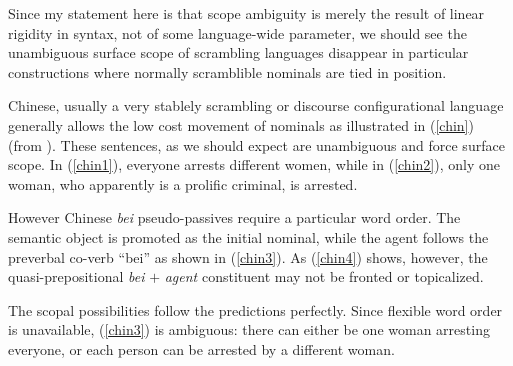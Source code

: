 \documentclass{article}
\begin{document}
Since my statement here is that scope ambiguity is merely the result of linear rigidity in syntax, not of some language-wide parameter, we should see the unambiguous surface scope of scrambling languages disappear in particular constructions where normally scramblible nominals are tied in position.

Chinese, usually a very stablely scrambling or discourse configurational language generally allows the low cost movement of nominals as illustrated in (\ref{chin}) (from \textcite{aoun93}). These sentences, as we should expect are unambiguous and force surface scope. In (\ref{chin1}), everyone arrests different women, while in (\ref{chin2}), only one woman, who apparently is a prolific criminal, is arrested.

\begin{exe}
\ex \begin{xlist}\label{chin}
\end{xlist}
\end{exe}

However Chinese \emph{bei} pseudo-passives require a particular word order. The semantic object is promoted as the initial nominal, while the agent follows the preverbal co-verb ``bei'' as shown in (\ref{chin3}). As (\ref{chin4}) shows, however, the quasi-prepositional \emph{bei} $+$ \emph{agent} constituent may not be fronted or topicalized.

\begin{exe}
\end{exe}

The scopal possibilities follow the predictions perfectly. Since flexible word order is unavailable, (\ref{chin3}) is ambiguous: there can either be one woman arresting everyone, or each person can be arrested by a different woman.
\end{document}
